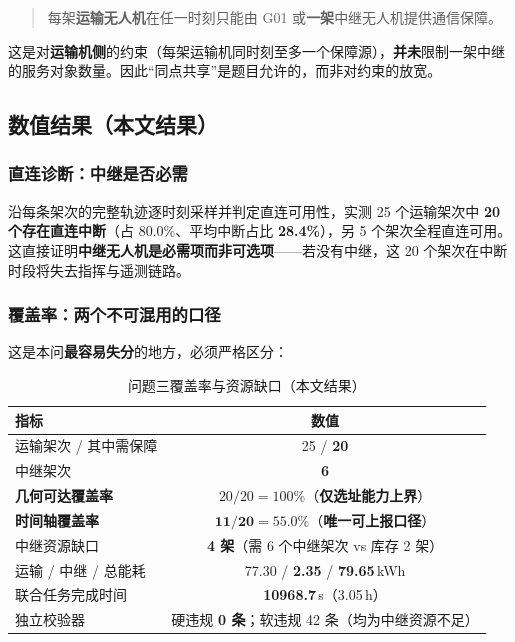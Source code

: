 \begin{quote}
	每架\textbf{运输无人机}在任一时刻只能由 G01 或\textbf{一架}中继无人机提供通信保障。
\end{quote}

这是对\textbf{运输机侧}的约束（每架运输机同时刻至多一个保障源），\textbf{并未}限制一架中继的服务对象数量。因此“同点共享”是题目允许的，而非对约束的放宽。

\subsection{数值结果（本文结果）}

\subsubsection{直连诊断：中继是否必需}

沿每条架次的完整轨迹逐时刻采样并判定直连可用性，实测 25 个运输架次中 \textbf{20 个存在直连中断}（占 80.0\%、平均中断占比 \textbf{28.4\%}），另 5 个架次全程直连可用。这直接证明\textbf{中继无人机是必需项而非可选项}——若没有中继，这 20 个架次在中断时段将失去指挥与遥测链路。

\subsubsection{覆盖率：两个不可混用的口径}\label{sec:q3gap}

这是本问\textbf{最容易失分}的地方，必须严格区分：

\begin{table}[htbp]
	\caption{问题三覆盖率与资源缺口（本文结果）}
	\label{tab:q3cov}
	\centering
	\begin{tabular}{lc}
		\toprule
		指标 & 数值 \\
		\midrule
		运输架次 / 其中需保障       & 25 / \textbf{20} \\
		中继架次                    & \textbf{6} \\
		\textbf{几何可达覆盖率}     & $20/20=100\%$（\textbf{仅选址能力上界}） \\
		\textbf{时间轴覆盖率}       & $\mathbf{11/20=55.0\%}$（\textbf{唯一可上报口径}） \\
		中继资源缺口                & \textbf{4 架}（需 6 个中继架次 vs 库存 2 架） \\
		运输 / 中继 / 总能耗        & 77.30 / \textbf{2.35} / \textbf{79.65}\,kWh \\
		联合任务完成时间            & \textbf{10968.7}\,s（3.05\,h） \\
		独立校验器                  & 硬违规 \textbf{0 条}；软违规 42 条（均为中继资源不足） \\
		\bottomrule
	\end{tabular}
\end{table}

